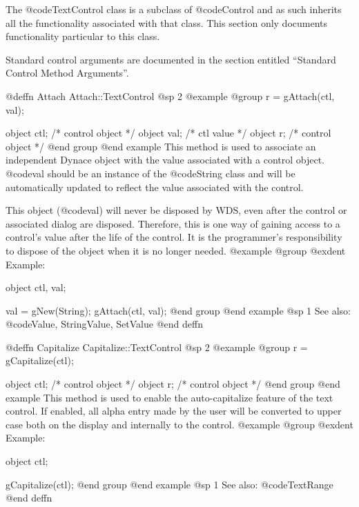 The @code{TextControl} class is a subclass of @code{Control} and as such
inherits all the functionality associated with that class.  This section
only documents functionality particular to this class.

Standard control arguments are documented in the section entitled
``Standard Control Method Arguments''.












@deffn {Attach} Attach::TextControl
@sp 2
@example
@group
r = gAttach(ctl, val);

object  ctl;   /*  control object  */
object  val;   /*  ctl value       */
object  r;     /*  control object  */
@end group
@end example
This method is used to associate an independent Dynace object with the
value associated with a control object.  @code{val} should be an
instance of the @code{String} class and will be automatically updated
to reflect the value associated with the control.

This object (@code{val}) will never be disposed by WDS, even after
the control or associated dialog are disposed.  Therefore, this
is one way of gaining access to a control's value after the life
of the control.  It is the programmer's responsibility to dispose of
the object when it is no longer needed.
@example
@group
@exdent Example:

object  ctl, val;

val = gNew(String);
gAttach(ctl, val);
@end group
@end example
@sp 1
See also:  @code{Value, StringValue, SetValue}
@end deffn












@deffn {Capitalize} Capitalize::TextControl
@sp 2
@example
@group
r = gCapitalize(ctl);

object  ctl;   /*  control object  */
object  r;     /*  control object  */
@end group
@end example
This method is used to enable the auto-capitalize feature of the text
control.  If enabled, all alpha entry made by the user will be converted
to upper case both on the display and internally to the control.
@example
@group
@exdent Example:

object  ctl;

gCapitalize(ctl);
@end group
@end example
@sp 1
See also:  @code{TextRange}
@end deffn



